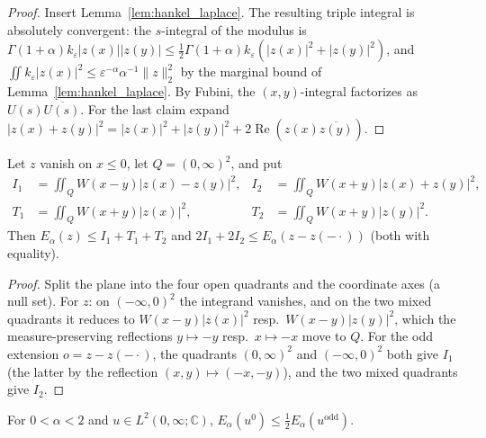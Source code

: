 \begin{proof}
\leanok
Insert Lemma~\ref{lem:hankel_laplace}. The resulting triple integral is absolutely convergent: the $s$-integral of the modulus is $\Gamma(1+\alpha) k_\varepsilon \lvert z(x)\rvert \lvert z(y)\rvert \le \tfrac12 \Gamma(1+\alpha) k_\varepsilon(\lvert z(x)\rvert^2 + \lvert z(y)\rvert^2)$, and $\iint k_\varepsilon \lvert z(x)\rvert^2 \le \varepsilon^{-\alpha}\alpha^{-1}\lVert z\rVert_2^2$ by the marginal bound of Lemma~\ref{lem:hankel_laplace}. By Fubini, the $(x, y)$-integral factorizes as $U(s)\overline{U(s)}$. For the last claim expand $\lvert z(x) + z(y)\rvert^2 = \lvert z(x)\rvert^2 + \lvert z(y)\rvert^2 + 2\operatorname{Re}(z(x)\overline{z(y)})$.
\end{proof}

\begin{lemma}\label{lem:quadrant_decomposition}
\leanok
Let $z$ vanish on $x \le 0$, let $Q = (0, \infty)^2$, and put
\begin{align*}
  I_1 &= \iint_Q W(x - y)\lvert z(x) - z(y)\rvert^2, & I_2 &= \iint_Q W(x + y)\lvert z(x) + z(y)\rvert^2,\\
  T_1 &= \iint_Q W(x + y)\lvert z(x)\rvert^2, & T_2 &= \iint_Q W(x + y)\lvert z(y)\rvert^2.
\end{align*}
Then $E_\alpha(z) \le I_1 + T_1 + T_2$ and $2 I_1 + 2 I_2 \le E_\alpha(z - z(-\cdot))$ (both with equality).
\end{lemma}

\begin{proof}
\leanok
Split the plane into the four open quadrants and the coordinate axes (a null set). For $z$: on $(-\infty, 0)^2$ the integrand vanishes, and on the two mixed quadrants it reduces to $W(x - y)\lvert z(x)\rvert^2$ resp.\ $W(x-y)\lvert z(y)\rvert^2$, which the measure-preserving reflections $y \mapsto -y$ resp.\ $x \mapsto -x$ move to $Q$. For the odd extension $o = z - z(-\cdot)$, the quadrants $(0,\infty)^2$ and $(-\infty, 0)^2$ both give $I_1$ (the latter by the reflection $(x, y) \mapsto (-x, -y)$), and the two mixed quadrants give $I_2$.
\end{proof}

\begin{theorem}\label{thm:restricted_le_spectral}
\leanok
For $0 < \alpha < 2$ and $u \in L^2(0, \infty; \mathbb{C})$, $E_\alpha(u^0) \le \tfrac12 E_\alpha(u^{\mathrm{odd}})$.
\end{theorem}

